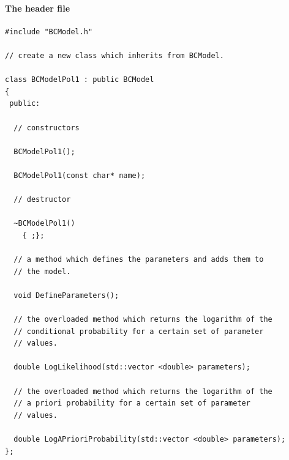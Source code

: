 \documentclass[11pt, a4paper]{article}
\begin{document}
\pagebreak 

\paragraph{The header file} 
\label{paragraph:headerfile}
% 
\begin{small} 
\begin{verbatim}
#include "BCModel.h" 

// create a new class which inherits from BCModel. 

class BCModelPol1 : public BCModel 
{
 public: 

  // constructors 

  BCModelPol1(); 

  BCModelPol1(const char* name); 

  // destructor 

  ~BCModelPol1()
    { ;};  

  // a method which defines the parameters and adds them to 
  // the model. 

  void DefineParameters(); 

  // the overloaded method which returns the logarithm of the 
  // conditional probability for a certain set of parameter 
  // values. 

  double LogLikelihood(std::vector <double> parameters); 

  // the overloaded method which returns the logarithm of the 
  // a priori probability for a certain set of parameter 
  // values. 

  double LogAPrioriProbability(std::vector <double> parameters); 
}; 
\end{verbatim} 
\end{small} 

\pagebreak 
\end{document}
